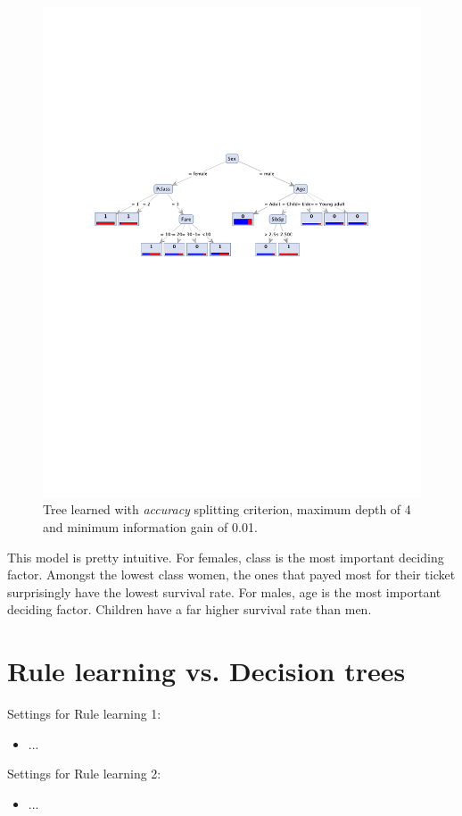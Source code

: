 \documentclass[12pt,a4paper]{article}
\begin{document}
\begin{figure}[htbp]
  \centering
  \includegraphics[width = .8\textwidth]{tree_final}
  \captionsetup{width=.8\textwidth}
  \caption{Tree learned with \emph{accuracy} splitting criterion, maximum depth of 4 and minimum information gain of 0.01.}
  \label{fig:tree_final}
\end{figure}
\par This model is pretty intuitive. For females, class is the most important deciding factor. Amongst the lowest class women, the ones that payed most for their ticket surprisingly have the lowest survival rate. For males, age is the most important deciding factor. Children have a far higher survival rate than men.

\section{Rule learning vs. Decision trees}

Settings for Rule learning 1:
\begin{itemize}
\item ...
\end{itemize}

Settings for Rule learning 2:
\begin{itemize}
\item ...
\end{itemize}
\end{document}

